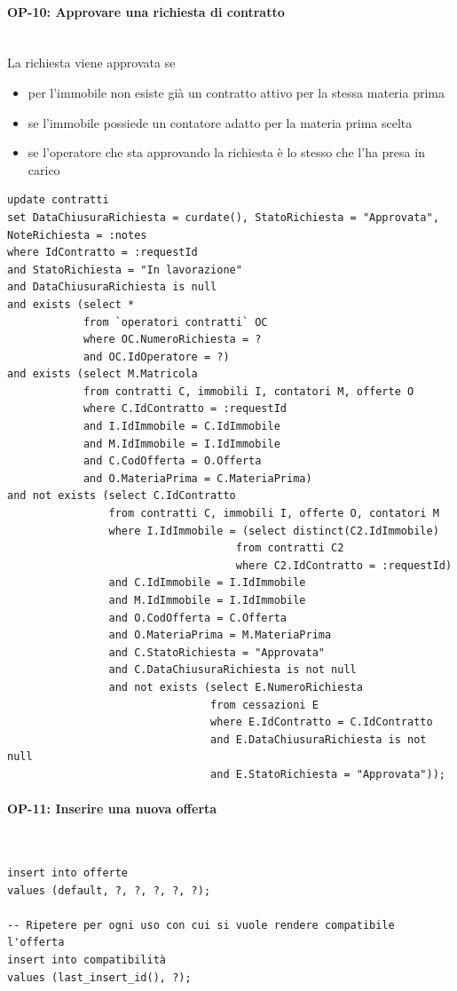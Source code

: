 \documentclass[a4paper,12pt]{report}
\begin{document}
\paragraph{OP-10: Approvare una richiesta di contratto}\mbox{}\\
La richiesta viene approvata se 
\begin{itemize}
    \item per l'immobile non esiste già un contratto attivo per la stessa materia prima
    \item se l'immobile possiede un contatore adatto per la materia prima scelta
    \item se l'operatore che sta approvando la richiesta è lo stesso che l'ha presa in carico
\end{itemize}
\begin{lstlisting}
update contratti
set DataChiusuraRichiesta = curdate(), StatoRichiesta = "Approvata", NoteRichiesta = :notes
where IdContratto = :requestId
and StatoRichiesta = "In lavorazione"
and DataChiusuraRichiesta is null
and exists (select *
            from `operatori contratti` OC
            where OC.NumeroRichiesta = ?
            and OC.IdOperatore = ?)
and exists (select M.Matricola
            from contratti C, immobili I, contatori M, offerte O
            where C.IdContratto = :requestId
            and I.IdImmobile = C.IdImmobile
            and M.IdImmobile = I.IdImmobile
            and C.CodOfferta = O.Offerta
            and O.MateriaPrima = C.MateriaPrima)
and not exists (select C.IdContratto
                from contratti C, immobili I, offerte O, contatori M
                where I.IdImmobile = (select distinct(C2.IdImmobile)
                                    from contratti C2
                                    where C2.IdContratto = :requestId)
                and C.IdImmobile = I.IdImmobile
                and M.IdImmobile = I.IdImmobile
                and O.CodOfferta = C.Offerta
                and O.MateriaPrima = M.MateriaPrima
                and C.StatoRichiesta = "Approvata"
                and C.DataChiusuraRichiesta is not null
                and not exists (select E.NumeroRichiesta
                                from cessazioni E
                                where E.IdContratto = C.IdContratto
                                and E.DataChiusuraRichiesta is not null
                                and E.StatoRichiesta = "Approvata"));
\end{lstlisting}

\paragraph{OP-11: Inserire una nuova offerta}\mbox{}\\
\begin{lstlisting}
insert into offerte
values (default, ?, ?, ?, ?, ?);

-- Ripetere per ogni uso con cui si vuole rendere compatibile l'offerta
insert into compatibilità
values (last_insert_id(), ?);
\end{lstlisting}
    
\end{document}
